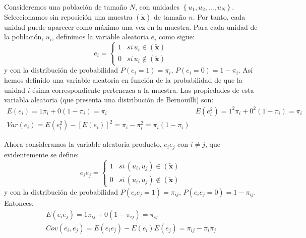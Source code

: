 Consideremos una poblaci\'on de tama\~no $N$, con unidades $\left\{ u_{1},u_{2},\ldots,u_{N}\right\} $.
Seleccionamos sin reposici\'on una muestra $\left(\tilde{\boldsymbol{x}}\right)$
de tama\~no $n$. Por tanto, cada unidad puede aparecer como m\'aximo
una vez en la muestra. Para cada unidad de la poblaci\'on, $u_{i}$,
definimos la variable aleatoria $e_{i}$ como sigue: 
\[
e_{i}=\begin{cases}
1 & si\,u_{i}\in\left(\tilde{\boldsymbol{x}}\right)\\
0 & si\,u_{i}\notin\left(\tilde{\boldsymbol{x}}\right)
\end{cases}
\]
 y con la distribuci\'on de probabilidad $P\left(e_{i}=1\right)=\pi_{i}$,
$P\left(e_{i}=0\right)=1-\pi_{i}$. As\'i hemos definido una variable
aleatoria en funci\'on de la probabilidad de que la unidad $i$-\'esima
correspondiente pertenezca a la muestra. Las propiedades de esta variabla
aleatoria (que presenta una distribuci\'on de Bernouilli) son: 
\[
\begin{array}{cc}
E\left(e_{i}\right)=1\pi_{i}+0\left(1-\pi_{i}\right)=\pi_{i} & E\left(e_{i}^{2}\right)=1^{2}\pi_{i}+0^{2}\left(1-\pi_{i}\right)=\pi_{i}\\
Var\left(e_{i}\right)=E\left(e_{i}^{2}\right)-\left[E\left(e_{i}\right)\right]^{2}=\pi_{i}-\pi_{i}^{2}=\pi_{i}\left(1-\pi_{i}\right)
\end{array}
\]


Ahora consideramos la variable aleatoria producto, $e_{i}e_{j}$ con
$i\neq j$, que evidentemente se define: 
\[
e_{i}e_{j}=\begin{cases}
1 & si\,\left(u_{i},u_{j}\right)\in\left(\tilde{\boldsymbol{x}}\right)\\
0 & si\,\left(u_{i},u_{j}\right)\notin\left(\tilde{\boldsymbol{x}}\right)
\end{cases}
\]
 y con la distribuci\'on de probabilidad $P\left(e_{i}e_{j}=1\right)=\pi_{ij}$,
$P\left(e_{i}e_{j}=0\right)=1-\pi_{ij}$. Entonces, 
\[
\begin{array}{c}
E\left(e_{i}e_{j}\right)=1\pi_{ij}+0\left(1-\pi_{ij}\right)=\pi_{ij}\\
Cov\left(e_{i},e_{j}\right)=E\left(e_{i}e_{j}\right)-E\left(e_{i}\right)E\left(e_{j}\right)=\pi_{ij}-\pi_{i}\pi_{j}
\end{array}
\]


